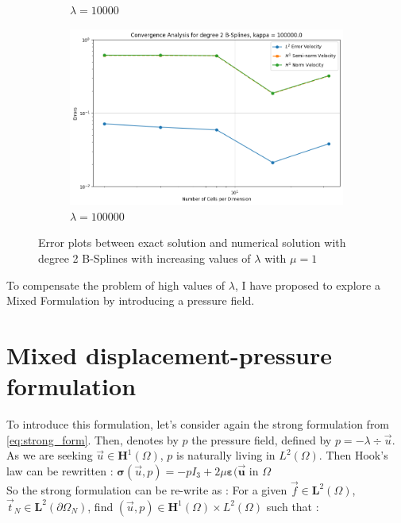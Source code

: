 \documentclass[a4paper,12pt,twoside]{report}
\begin{document}
\begin{figure}[!h]
\begin{subfigure}[b]{0.49\textwidth}
		\caption{$\lambda=10000$}
	\end{subfigure}
	\begin{subfigure}[b]{0.49\textwidth}
		\centering
		\includegraphics[width=\textwidth]{convergence_degree_2_non_mixed_kappa=100000.0}
		\caption{$\lambda=100000$}
	\end{subfigure}
	\caption{Error plots between exact solution and numerical solution with degree 2 B-Splines with increasing values of $\lambda$ with $\mu = 1$}
	\label{fig:error_kappa}
\end{figure}


\newpage

To compensate the problem of high values of $\lambda$, I have proposed to explore a Mixed Formulation by introducing a pressure field.


\section{Mixed displacement-pressure formulation}
To introduce this formulation, let's consider again the strong formulation from \eqref{eq:strong_form}. Then, denotes by $p$ the pressure field, defined by $\displaystyle p = - \lambda \div{\vec u}$. As we are seeking $\vec u \in \boldsymbol{H}^1(\Omega)$, $p$ is naturally living in $L^2(\Omega)$. Then Hook's law can be rewritten : $\boldsymbol{\sigma} (\vec u,p) = -p I_3 + 2\mu \boldsymbol{\varepsilon(\vec u} \text{ in }  \Omega $ \\
So the strong formulation can be re-write as : For a given $\vec f \in \boldsymbol L^2(\Omega)$, $\vec t_N \in \boldsymbol L^2(\partial \Omega_N)$, find $(\vec u, p) \in \boldsymbol H^1(\Omega)\times L^2(\Omega)$ such that : 
\end{document}

